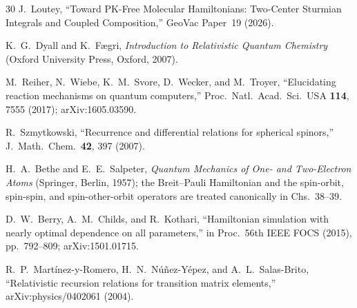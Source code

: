 \documentclass[aps,pra,twocolumn,superscriptaddress,longbibliography]{revtex4-2}
\begin{document}
\begin{thebibliography}{30}
J.~Loutey,
``Toward PK-Free Molecular Hamiltonians: Two-Center Sturmian
Integrals and Coupled Composition,''
GeoVac Paper~19 (2026).


K.~G.~Dyall and K.~F\ae gri,
\textit{Introduction to Relativistic Quantum Chemistry}
(Oxford University Press, Oxford, 2007).

M.~Reiher, N.~Wiebe, K.~M.~Svore, D.~Wecker, and M.~Troyer,
``Elucidating reaction mechanisms on quantum computers,''
Proc.\ Natl.\ Acad.\ Sci.\ USA \textbf{114}, 7555 (2017);
arXiv:1605.03590.

R.~Szmytkowski,
``Recurrence and differential relations for spherical spinors,''
J.~Math.\ Chem.\ \textbf{42}, 397 (2007).

H.~A.~Bethe and E.~E.~Salpeter,
\textit{Quantum Mechanics of One- and Two-Electron Atoms}
(Springer, Berlin, 1957); the Breit--Pauli Hamiltonian and the
spin-orbit, spin-spin, and spin-other-orbit operators are treated
canonically in Chs.~38--39.

D.~W.~Berry, A.~M.~Childs, and R.~Kothari,
``Hamiltonian simulation with nearly optimal dependence on all
parameters,'' in Proc.\ 56th IEEE FOCS (2015), pp.~792--809;
arXiv:1501.01715.

R.~P.~Mart\'inez-y-Romero, H.~N.~N\'u\~nez-Y\'epez, and
A.~L.~Salas-Brito,
``Relativistic recursion relations for transition matrix elements,''
arXiv:physics/0402061 (2004).


\end{thebibliography}
\end{document}
